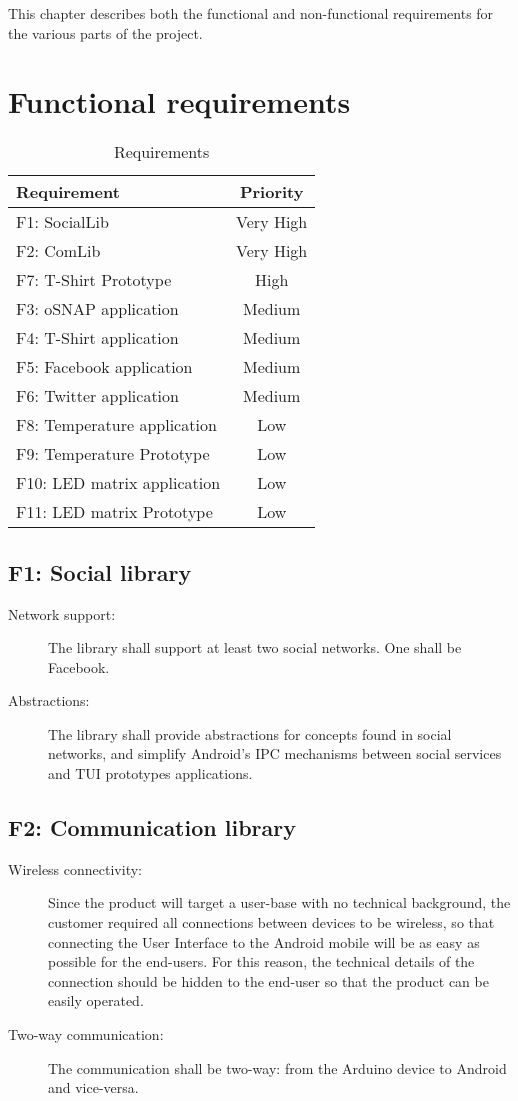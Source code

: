 
This chapter describes both the functional and non-functional requirements
for the various parts of the project.

\section{Functional requirements}

\begin{table}
		\caption{Requirements}
\begin{tabular}{ | l | c | }
	\hline                        
	\bf{Requirement} & \bf{Priority} \\
	\hline
	F1:  SocialLib					& Very High \\
	F2:  ComLib						& Very High \\
	F7:  T-Shirt Prototype			& High \\
	F3:  oSNAP application			& Medium \\
	F4:  T-Shirt application		& Medium \\
	F5:  Facebook application		& Medium \\
	F6:  Twitter application		& Medium \\
	F8:  Temperature application 	& Low \\
	F9:  Temperature Prototype		& Low \\
	F10: LED matrix application		& Low \\
	F11: LED matrix Prototype		& Low \\
	\hline  
\end{tabular}
\end{table}

\subsection{F1: Social library}
\begin{description}
	\item[Network support:] The library shall support at least two social
	networks. One shall be Facebook.
	\item[Abstractions:] The library shall provide abstractions for concepts
	found in social networks, and simplify Android's IPC mechanisms
	between social services and TUI prototypes applications.
\end{description}
	
\subsection{F2: Communication library}
\begin{description}
	\item[Wireless connectivity:] Since the product will target a user-base
	with no technical background, the customer required all connections
	between devices to be wireless, so that connecting the User Interface
	to the Android mobile will be as easy as possible for the end-users.
	For this reason, the technical details of the connection should be
	hidden to the end-user so that the product can be easily operated.
	\item[Two-way communication:] The communication shall be two-way:
	from the Arduino device to Android and vice-versa.
\end{description}

